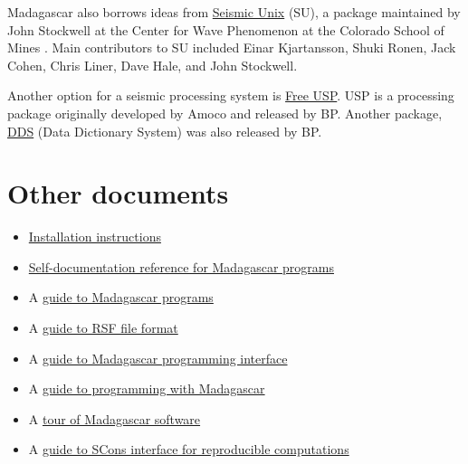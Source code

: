 Madagascar also borrows ideas from \href{http://timna.mines.edu/cwpcodes/}{Seismic Unix} (SU), a package maintained by John
Stockwell at the Center for Wave Phenomenon at the Colorado School of Mines
\cite[]{TLE16-07-10451049,su}. Main contributors to SU
included Einar Kjartansson, Shuki Ronen, Jack Cohen, Chris Liner, Dave Hale,
and John Stockwell.

Another option for a seismic processing system is
\href{http://www.freeusp.org/}{Free USP}. USP is a processing package
originally developed by Amoco and released by BP. Another package,
\href{http://www.freeusp.org/DDS/}{DDS} (Data Dictionary System) was
also released by BP.

\begin{comment}
None of these alternative packages can be qualified as free software
according to the
\href{http://www.fsf.org/philosophy/free-sw.html}{Free Software Foundation} or as open-source software according to the
\href{http://www.opensource.org/docs/definition.php}{Open Source Initiative}.  However, they are available for free in the source form
under certain conditions. The Madagascar package is both free and
open-source.
\end{comment}

\section{Other documents}

\begin{itemize}
\item  \href{http://egl.beg.utexas.edu/RSF/book/rsf/rsf/install_html/}{Installation instructions}
\item \href{http://egl.beg.utexas.edu/RSF/}{Self-documentation reference for Madagascar programs}
\item A \href{http://egl.beg.utexas.edu/RSF/book/rsf/rsf/prog_html/}{guide to Madagascar programs}
\item A \href{http://egl.beg.utexas.edu/RSF/book/rsf/rsf/format_html/}{guide to RSF file format}
\item A \href{http://egl.beg.utexas.edu/RSF/book/rsf/rsf/api_html/}{guide to  Madagascar programming interface}
\item A \href{http://egl.beg.utexas.edu/RSF/book/rsf/rsf/demo_html/}{guide to programming with Madagascar}
\item A \href{http://egl.beg.utexas.edu/RSF/book/rsf/rsf/tour_html/}{tour of Madagascar software}
\item A \href{http://egl.beg.utexas.edu/RSF/book/rsf/scons/paper_html/}{guide to SCons interface for reproducible computations}
\end{itemize}




%


